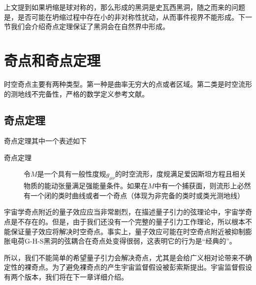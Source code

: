 上文提到如果坍缩是球对称的，那么形成的黑洞是史瓦西黑洞，随之而来的问题是，是否可能在坍缩过程中存在小的非对称性扰动，从而事件视界不能形成。下一节我们会介绍奇点定理保证了黑洞会在自然界中形成。

\section{奇点和奇点定理}
时空奇点主要有两种类型。第一种是曲率无穷大的点或者区域。第二类是时空流形的测地线不完备性，严格的数学定义参考文献\citep{penrose1999question}。
\subsection{奇点定理}
奇点定理其中一个表述如下\citep{陈斌2018广义相对论}

\begin{description}
    \item[奇点定理]  令$M$是一个具有一般性度规$g_{\mu \nu}$的时空流形，度规满足爱因斯坦方程且相关物质的能动张量满足强能量条件。如果在$M$中有一个捕获面，则流形上必然有一个闭的类时曲线或者一个奇点（体现为非完备的类时或类光测地线）
\end{description}

宇宙学奇点附近的量子效应应当非常剧烈，在描述量子引力的弦理论中，宇宙学奇点是不存在的。但是，由于我们还没有一个完整的量子引力工作理论，所以根本不能保证量子效应将解决时空奇点。事实上，量子效应可能在时空奇点附近被抑制膨胀电荷G-H-S黑洞的弦耦合在奇点处变得很弱，这表明它的行为是“经典的”\citep{ong2020space}。

所以，我们不能简单的希望量子引力会解决奇点，尤其是会给广义相对论带来不确定性的裸奇点。为了避免裸奇点的产生宇宙监督假设被彭索斯提出。宇宙监督假设有两个版本，我们将在下一章详细介绍。
